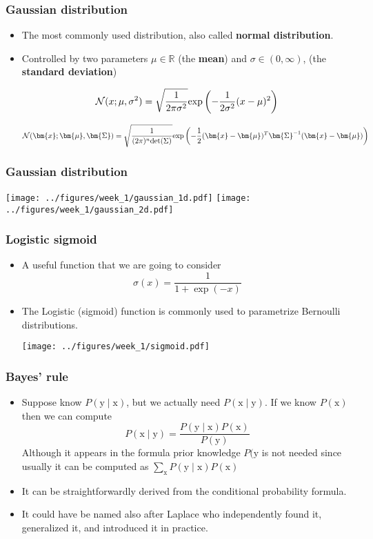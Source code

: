 \documentclass[notes]{beamer}          %
\newcommand{\vect}[1]{\bm{#1}}
\newcommand{\field}[1]{\mathbb{#1}}
\newcommand{\R}{\field{R}}
\begin{document}
\begin{frame}
\frametitle{Gaussian distribution}
\begin{itemize}
    \item The most commonly used distribution, also called {\bf normal distribution}.
    \item Controlled by two parameters $\mu \in \R$ (the {\bf mean}) and $\sigma \in (0, \infty)$, (the {\bf standard deviation})

    $$
    {\cal N}(x ; \mu, \sigma^2) = \sqrt{\frac{1}{2 \pi \sigma^2}} \mbox{exp} \left (-\frac{1}{2 \sigma^2}(x - \mu)^2 \right )
    $$

    $$
    {\cal N}(\vect{x} ; \vect{\mu}, \vect{\Sigma}) = \sqrt{\frac{1}{(2 \pi)^n \mbox{det}(\Sigma)}} \mbox{exp} \left (-\frac{1}{2} (\vect{x} - \vect{\mu})^T \vect{\Sigma}^{-1} (\vect{x} - \vect{\mu}) \right )
    $$


\end{itemize}
\end{frame}


\begin{frame}
\frametitle{Gaussian distribution}
\begin{center}
\texttt{[image: ../figures/week\_1/gaussian\_1d.pdf]}
\hfill
\texttt{[image: ../figures/week\_1/gaussian\_2d.pdf]}
\end{center}
\end{frame}

\begin{frame}
\frametitle{Logistic sigmoid}
\begin{itemize}
    \item A useful function that we are going to consider
    $$\sigma(x) = \frac{1}{1 + \exp{(-x)}}$$
    \item The Logistic (sigmoid) function is commonly used to parametrize Bernoulli distributions.
    \begin{center}
    \texttt{[image: ../figures/week\_1/sigmoid.pdf]}
    \end{center}

\end{itemize}
\end{frame}


\begin{frame}
\frametitle{Bayes' rule}
\begin{itemize}
    \item Suppose know $P(\text{y} \mid \text{x})$, but we actually need $P(\text{x} \mid \text{y})$. If we know $P(\text{x})$ then we can compute
    $$
        P(\text{x} \mid \text{y}) = \frac{P(\text{y} \mid \text{x})P(\text{x})}{P(\text{y})}
    $$
    Although it appears in the formula prior knowledge $P(\text{y}$ is not needed since usually it can be computed as $\sum_{\text{x}} P(\text{y} \mid \text{x})P(\text{x})$
    \item It can be straightforwardly derived from the conditional probability formula.
    \item It could have be named also after Laplace who independently found it, generalized it, and introduced it in practice.
\end{itemize}
\end{frame}
\end{document}
